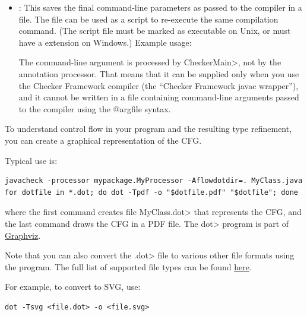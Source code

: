 
\begin{itemize}

\item {}:
  This saves the final command-line parameters as passed to the compiler in a file.
  The file can be used as a script to re-execute the same compilation command.
  (The script file must be marked as executable on Unix, or
  must have a  extension on Windows.)
  Example usage: 

  The  command-line argument is processed by
  \<CheckerMain>, not by the annotation processor.  That means that it can be
  supplied only when you use the Checker Framework compiler (the ``Checker
  Framework javac wrapper''), and it cannot be written in a file containing
  command-line arguments passed to the compiler using the @argfile syntax.

\end{itemize}


To understand control flow in your program and the resulting type
refinement, you can create a graphical representation of the CFG.

Typical use is:

\begin{Verbatim}
javacheck -processor mypackage.MyProcessor -Aflowdotdir=. MyClass.java
for dotfile in *.dot; do dot -Tpdf -o "$dotfile.pdf" "$dotfile"; done
\end{Verbatim}

\noindent
where the first command creates file \<MyClass.dot> that
represents the CFG, and the last command draws the CFG in a PDF file.
The \<dot> program is part of \href{http://www.graphviz.org}{Graphviz}.

\noindent
Note that you can also convert the \<.dot> file to various other file formats using
the  program. The full list of supported file types can be found \href{http://www.graphviz.org/doc/info/output.html}{here}.

\noindent
For example, to convert to SVG, use:

\begin{Verbatim}
dot -Tsvg <file.dot> -o <file.svg>
\end{Verbatim}


